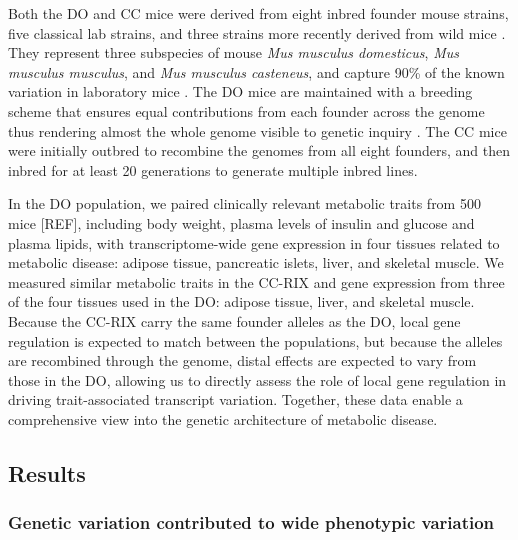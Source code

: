 \documentclass[
]{article}
\begin{document}
Both the DO and CC mice were derived from eight inbred founder mouse
strains, five classical lab strains, and three strains more recently
derived from wild mice \cite{pmid22892839}. They represent three
subspecies of mouse \textit{Mus musculus domesticus},
\textit{Mus musculus musculus}, and \textit{Mus musculus casteneus}, and
capture 90\% of the known variation in laboratory mice
\cite{pmid31133439}. The DO mice are maintained with a breeding scheme
that ensures equal contributions from each founder across the genome
thus rendering almost the whole genome visible to genetic inquiry
\cite{pmid22892839}. The CC mice were initially outbred to recombine the
genomes from all eight founders, and then inbred for at least 20
generations to generate multiple inbred lines.

In the DO population, we paired clinically relevant metabolic traits
from 500 mice {[}REF{]}, including body weight, plasma levels of insulin
and glucose and plasma lipids, with transcriptome-wide gene expression
in four tissues related to metabolic disease: adipose tissue, pancreatic
islets, liver, and skeletal muscle. We measured similar metabolic traits
in the CC-RIX and gene expression from three of the four tissues used in
the DO: adipose tissue, liver, and skeletal muscle. Because the CC-RIX
carry the same founder alleles as the DO, local gene regulation is
expected to match between the populations, but because the alleles are
recombined through the genome, distal effects are expected to vary from
those in the DO, allowing us to directly assess the role of local gene
regulation in driving trait-associated transcript variation. Together,
these data enable a comprehensive view into the genetic architecture of
metabolic disease.

\subsection{Results}\label{results}

\subsubsection{Genetic variation contributed to wide phenotypic
variation}\label{genetic-variation-contributed-to-wide-phenotypic-variation}
\end{document}
